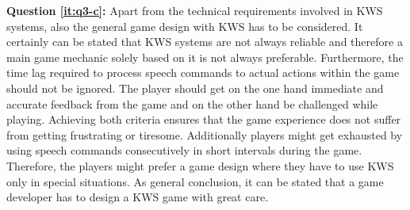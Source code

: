 \textbf{Question \ref{it:q3-c}:}
Apart from the technical requirements involved in KWS systems, also the general game design with KWS has to be considered.
It certainly can be stated that KWS systems are not always reliable and therefore a main game mechanic solely based on it is not always preferable.
Furthermore, the time lag required to process speech commands to actual actions within the game should not be ignored.
The player should get on the one hand immediate and accurate feedback from the game and on the other hand be challenged while playing.
Achieving both criteria ensures that the game experience does not suffer from getting frustrating or tiresome.
Additionally players might get exhausted by using speech commands consecutively in short intervals during the game.
Therefore, the players might prefer a game design where they have to use KWS only in special situations.
As general conclusion, it can be stated that a game developer has to design a KWS game with great care.